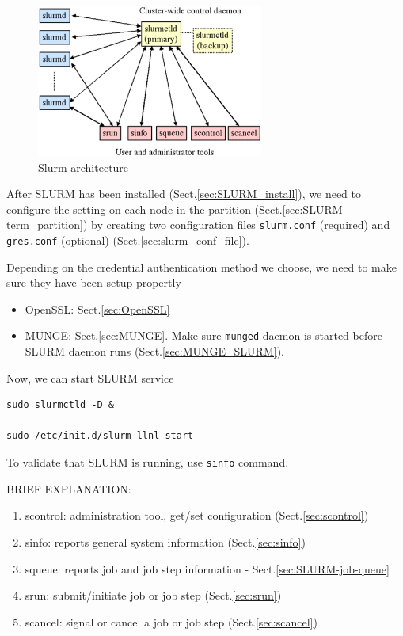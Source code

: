 \begin{figure}[hbt]
 \centerline{\includegraphics[height=5cm]{./images/slurm_structure.eps}}
 \caption{Slurm architecture}
\label{fig:slurm_structure}
\end{figure}

After SLURM has been installed (Sect.\ref{sec:SLURM_install}), we need to 
configure the setting on each node in the partition
(Sect.\ref{sec:SLURM-term_partition}) by creating two configuration files
\verb!slurm.conf! (required) and \verb!gres.conf! (optional) (Sect.\ref{sec:slurm_conf_file}). 

Depending on the credential authentication method we choose, we need to make
sure they have been setup propertly
\begin{itemize}
  \item OpenSSL: Sect.\ref{sec:OpenSSL}
  \item MUNGE: Sect.\ref{sec:MUNGE}. Make sure \verb!munged! daemon is started before SLURM
daemon runs (Sect.\ref{sec:MUNGE_SLURM}). 
\end{itemize}


Now, we can start SLURM service
\begin{verbatim}
sudo slurmctld -D &

sudo /etc/init.d/slurm-llnl start
\end{verbatim}
To validate that SLURM is running, use \verb!sinfo! command.

BRIEF EXPLANATION: 
\begin{enumerate}
  \item  scontrol: administration tool, get/set configuration
  (Sect.\ref{sec:scontrol})
  \item  sinfo: reports general system information (Sect.\ref{sec:sinfo})
  \item  squeue: reports job and job step information - Sect.\ref{sec:SLURM-job-queue}
  \item  srun: submit/initiate job or job step (Sect.\ref{sec:srun})
  \item  scancel: signal or cancel a job or job step (Sect.\ref{sec:scancel})
\end{enumerate}


